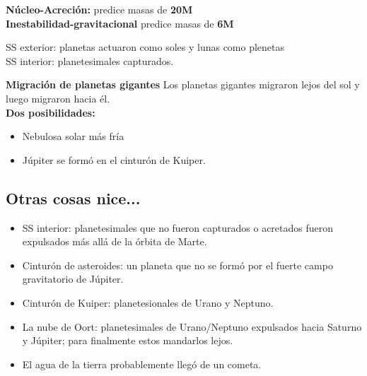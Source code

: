 \documentclass[11pt,fleqn]{book} %
\begin{document}
\begin{remark}
\textbf{Núcleo-Acreción: } predice masas de \textbf{20M}\\
\textbf{Inestabilidad-gravitacional} predice masas de \textbf{6M}
\end{remark}

\begin{notation}
SS exterior: planetas actuaron como soles y lunas como plenetas\\
SS interior: planetesimales capturados. 
\end{notation}

\begin{remark}
\textbf{Migración de planetas gigantes}
Los planetas gigantes migraron lejos del sol y luego migraron hacia él.\\
\textbf{Dos posibilidades: }
\begin{itemize}
    \item Nebulosa solar más fría
    \item Júpiter se formó en el cinturón de Kuiper. 
\end{itemize}

\end{remark}

\subsection{Otras cosas nice...}
\begin{itemize}
    \item SS interior: planetesimales que no fueron capturados o acretados fueron expulsados más allá de la órbita de Marte. 
    \item Cinturón de asteroides: un planeta que no se formó por el fuerte campo gravitatorio de Júpiter. 
    \item Cinturón de Kuiper: planetesionales de Urano y Neptuno.  
    \item La nube de Oort: planetesimales de Urano/Neptuno expulsados hacia Saturno y Júpiter; para finalmente estos mandarlos lejos. 
    \item El agua de la tierra probablemente llegó de un cometa. 
\end{itemize}
\end{document}
